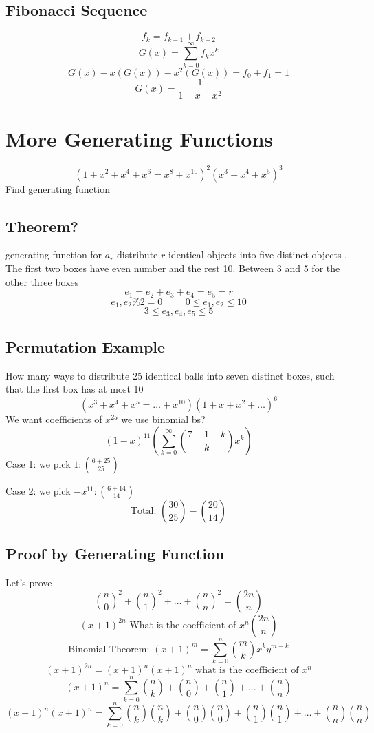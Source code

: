 \documentclass{report}
\begin{document}
\section{Fibonacci Sequence}
\[
f_k = f_{k-1} + f_{k-2}
\]
\[
G(x) = \sum^\infty_{k=0} f_k x^k
\]
\[
G(x) - x(G(x)) - x^2(G(x)) = f_0 + f_1 = 1
\]
\[
G(x) = \frac{1}{1 - x - x^2}
\]


\chapter{More Generating Functions}
\[
(1 + x^2 + x^4 + x^6 = x^8 + x^{10})^2(x^3+x^4 + x^5)^3
\]
Find generating function

\section{Theorem?}
generating function for $a_r$ distribute $r$ identical objects into five distinct objects . The first two boxes have even number and the rest 10. Between 3 and 5 for the other three boxes
\[
e_1 = e_2 + e_3 + e_4 = e_5 = r
\]
\[
e_1,e_2 \% 2 = 0 
\hspace{1cm}
0 \leq e_1, e_2 \leq 10
\]
\[
3 \leq e_3, e_4, e_5 \leq 5
\]

\section{Permutation Example}
How many ways to distribute 25 identical balls into seven distinct boxes, such that the first box has at most 10
\[
(x^3+x^4 + x^5 = \ldots + x^{10})(1 + x + x^2 + \ldots)^6
\]
We want coefficients of $x^{25}$ we use binomial bs?
\[
(1 - x)^{11} \left( \sum^\infty_{k=0} {7 - 1 - k \choose k}x^k \right)
\]
Case 1: we pick $1: {6 + 25 \choose 25}$

Case 2: we pick $-x^{11}: {6 + 14 \choose 14}$
\[
\textrm{Total: } {30 \choose 25}  - {20 \choose 14}
\]

\section{Proof by Generating Function}
Let's prove
\[
{n \choose 0}^2 + {n \choose 1}^2 + \ldots + {n \choose n}^2 = {2n \choose n}
\]
\[
(x+1)^{2n} \textrm{ What is the coefficient of $x^n$} {2n \choose n}
\]
\[
\textrm{Binomial Theorem: } (x + 1)^m = \sum^n_{k = 0} {m \choose k}x^k y^{m-k}
\]
\[
(x + 1)^{2n} = (x + 1)^n(x + 1)^n \textrm{ what is the coefficient of $x^n$}
\]
\[
(x+1)^n = \sum^n_{k=0} {n \choose k} + {n \choose 0} + {n \choose 1} + \ldots + {n \choose n}
\]
\[
(x+1)^n(x+1)^n = \sum^n_{k=0} {n \choose k}{n \choose k} 
+ 
{n \choose 0}{n \choose 0} 
+ 
{n \choose 1}{n \choose 1} 
+ 
\ldots 
+ 
{n \choose n}{n \choose n}
\]
\end{document}

